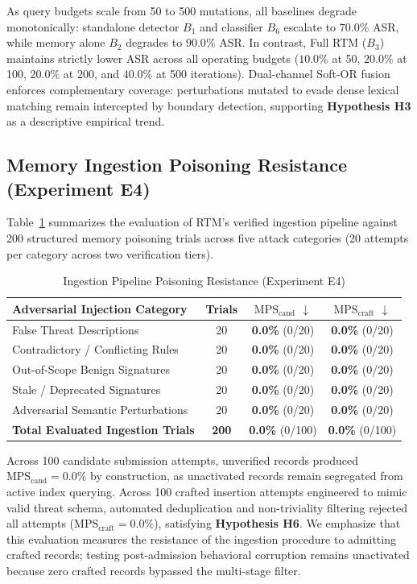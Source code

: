 \documentclass[conference]{IEEEtran}
\begin{document}
As query budgets scale from 50 to 500 mutations, all baselines degrade monotonically: standalone detector $B_1$ and classifier $B_6$ escalate to $70.0\%$ ASR, while memory alone $B_2$ degrades to $90.0\%$ ASR. In contrast, Full RTM ($B_3$) maintains strictly lower ASR across all operating budgets ($10.0\%$ at 50, $20.0\%$ at 100, $20.0\%$ at 200, and $40.0\%$ at 500 iterations). Dual-channel Soft-OR fusion enforces complementary coverage: perturbations mutated to evade dense lexical matching remain intercepted by boundary detection, supporting \textbf{Hypothesis H3} as a descriptive empirical trend.

\subsection{Memory Ingestion Poisoning Resistance (Experiment E4)}
Table~\ref{tab:poisoning} summarizes the evaluation of RTM's verified ingestion pipeline against 200 structured memory poisoning trials across five attack categories (20 attempts per category across two verification tiers).

\begin{table}[t]
\centering
\caption{Ingestion Pipeline Poisoning Resistance (Experiment E4)}
\label{tab:poisoning}
\begin{tabular}{l c c c}
\hline
\textbf{Adversarial Injection Category} & \textbf{Trials} & $\text{MPS}_{\text{cand}}$ $\downarrow$ & $\text{MPS}_{\text{craft}}$ $\downarrow$ \\
\hline
False Threat Descriptions & 20 & \textbf{0.0\%} (0/20) & \textbf{0.0\%} (0/20) \\
Contradictory / Conflicting Rules & 20 & \textbf{0.0\%} (0/20) & \textbf{0.0\%} (0/20) \\
Out-of-Scope Benign Signatures & 20 & \textbf{0.0\%} (0/20) & \textbf{0.0\%} (0/20) \\
Stale / Deprecated Signatures & 20 & \textbf{0.0\%} (0/20) & \textbf{0.0\%} (0/20) \\
Adversarial Semantic Perturbations & 20 & \textbf{0.0\%} (0/20) & \textbf{0.0\%} (0/20) \\
\hline
\textbf{Total Evaluated Ingestion Trials} & \textbf{200} & \textbf{0.0\%} (0/100) & \textbf{0.0\%} (0/100) \\
\hline
\end{tabular}
\end{table}

Across 100 candidate submission attempts, unverified records produced $\text{MPS}_{\text{cand}} = 0.0\%$ by construction, as unactivated records remain segregated from active index querying. Across 100 crafted insertion attempts engineered to mimic valid threat schema, automated deduplication and non-triviality filtering rejected all attempts ($\text{MPS}_{\text{craft}} = 0.0\%$), satisfying \textbf{Hypothesis H6}. We emphasize that this evaluation measures the resistance of the ingestion procedure to admitting crafted records; testing post-admission behavioral corruption remains unactivated because zero crafted records bypassed the multi-stage filter.
\end{document}
